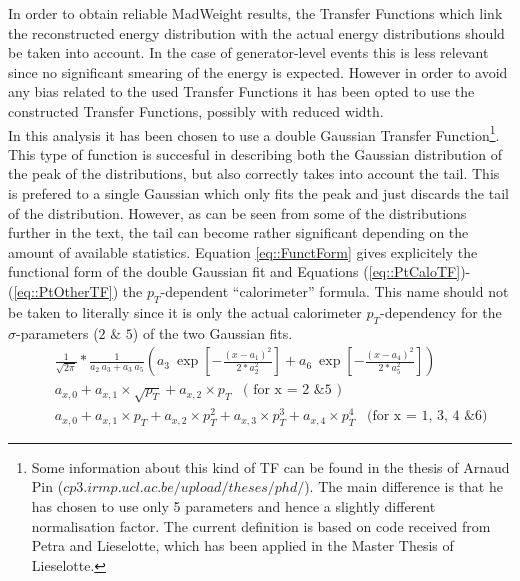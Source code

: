 In order to obtain reliable MadWeight results, the Transfer Functions which link the reconstructed energy distribution with the actual energy distributions should be taken into account. In the case of generator-level events this is less relevant since no significant smearing of the energy is expected. However in order to avoid any bias related to the used Transfer Functions it has been opted to use the constructed Transfer Functions, possibly with reduced width.\\

In this analysis it has been chosen to use a double Gaussian Transfer Function\footnote{Some information about this kind of TF can be found in the thesis of Arnaud Pin ($cp3.irmp.ucl.ac.be/upload/theses/phd/$). The main difference is that he has chosen to use only 5 parameters and hence a slightly different normalisation factor. The current definition is based on code received from Petra and Lieselotte, which has been applied in the Master Thesis of Lieselotte.}. This type of function is succesful in describing both the Gaussian distribution of the peak of the distributions, but also correctly takes into account the tail. This is prefered to a single Gaussian which only fits the peak and just discards the tail of the distribution. However, as can be seen from some of the distributions further in the text, the tail can become rather significant depending on the amount of available statistics.
Equation \ref{eq::FunctForm} gives explicitely the functional form of the double Gaussian fit and Equations (\ref{eq::PtCaloTF})-(\ref{eq::PtOtherTF}) the $p_T$-dependent ``calorimeter'' formula. This name should not be taken to literally since it is only the actual calorimeter $p_T$-dependency for the $\sigma$-parameters ($2$ $\&$ $5$) of the two Gaussian fits.
\begin{eqnarray}
 & & \frac{1}{\sqrt{2\pi}}*\frac{1}{a_2 ~ a_3 + a_3 ~ a_5}\left( a_3 ~ \exp\left[-\frac{(x-a_1)^2}{2*a_{2}^{2}}\right] + a_6 ~ \exp \left[-\frac{(x-a_4)^2}{2*a_{5}^{2}} \right] \right) \label{eq::FunctForm} \\
 & & a_{x,0} + a_{x,1} \times \sqrt{p_T} + a_{x,2} \times p_T \;\;\;  \textrm{( for x = 2 \& 5 )} \label{eq::PtCaloTF} \\
 & & a_{x,0} + a_{x,1} \times p_T + a_{x,2} \times p_{T}^{2} + a_{x,3} \times p_{T}^{3} + a_{x,4} \times p_{T}^{4} \;\;\; \textrm{(for x = 1, 3, 4 \& 6)} \label{eq::PtOtherTF} 
\end{eqnarray}

